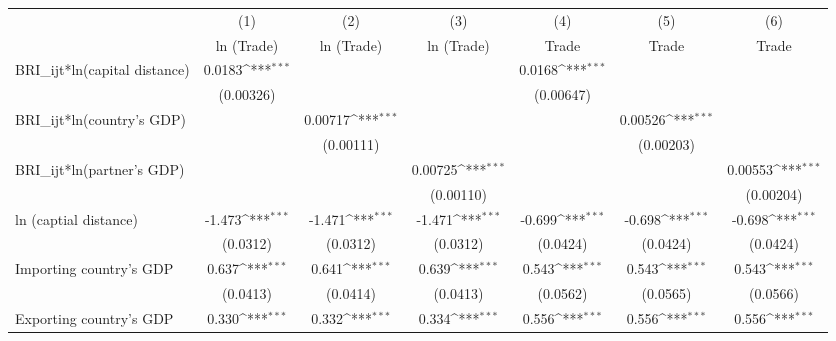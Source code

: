 {
\def\sym#1{\ifmmode^{#1}\else\(^{#1}\)\fi}
\begin{tabular}{l*{6}{c}}
\hline\hline
                    &\multicolumn{1}{c}{(1)}&\multicolumn{1}{c}{(2)}&\multicolumn{1}{c}{(3)}&\multicolumn{1}{c}{(4)}&\multicolumn{1}{c}{(5)}&\multicolumn{1}{c}{(6)}\\
                    &\multicolumn{1}{c}{ln (Trade)}&\multicolumn{1}{c}{ln (Trade)}&\multicolumn{1}{c}{ln (Trade)}&\multicolumn{1}{c}{Trade}&\multicolumn{1}{c}{Trade}&\multicolumn{1}{c}{Trade}\\
\hline
BRI\_ijt*ln(capital distance)&      0.0183\sym{***}&                     &                     &      0.0168\sym{***}&                     &                     \\
                    &   (0.00326)         &                     &                     &   (0.00647)         &                     &                     \\
[1em]
BRI\_ijt*ln(country's GDP)&                     &     0.00717\sym{***}&                     &                     &     0.00526\sym{***}&                     \\
                    &                     &   (0.00111)         &                     &                     &   (0.00203)         &                     \\
[1em]
BRI\_ijt*ln(partner's GDP)&                     &                     &     0.00725\sym{***}&                     &                     &     0.00553\sym{***}\\
                    &                     &                     &   (0.00110)         &                     &                     &   (0.00204)         \\
[1em]
ln (captial distance)&      -1.473\sym{***}&      -1.471\sym{***}&      -1.471\sym{***}&      -0.699\sym{***}&      -0.698\sym{***}&      -0.698\sym{***}\\
                    &    (0.0312)         &    (0.0312)         &    (0.0312)         &    (0.0424)         &    (0.0424)         &    (0.0424)         \\
[1em]
Importing country's GDP&       0.637\sym{***}&       0.641\sym{***}&       0.639\sym{***}&       0.543\sym{***}&       0.543\sym{***}&       0.543\sym{***}\\
                    &    (0.0413)         &    (0.0414)         &    (0.0413)         &    (0.0562)         &    (0.0565)         &    (0.0566)         \\
[1em]
Exporting country's GDP&       0.330\sym{***}&       0.332\sym{***}&       0.334\sym{***}&       0.556\sym{***}&       0.556\sym{***}&       0.556\sym{***}\\

\end{tabular}}
